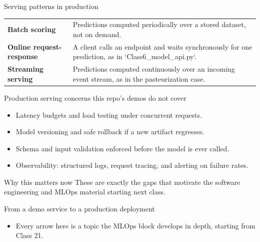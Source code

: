 \begin{frame}{Serving patterns in production}
\begin{tabularx}{\textwidth}{>{\bfseries}l X}
Batch scoring & Predictions computed periodically over a stored dataset, not on demand. \\
Online request-response & A client calls an endpoint and waits synchronously for one prediction, as in `Class6\_model\_api.py`. \\
Streaming serving & Predictions computed continuously over an incoming event stream, as in the pasteurization case. \\
\end{tabularx}
\coursefooter
\end{frame}

\begin{frame}{Production serving concerns this repo's demos do not cover}
\begin{itemize}
\item Latency budgets and load testing under concurrent requests.
\item Model versioning and safe rollback if a new artifact regresses.
\item Schema and input validation enforced before the model is ever called.
\item Observability: structured logs, request tracing, and alerting on failure rates.
\end{itemize}
\begin{block}{Why this matters now}
These are exactly the gaps that motivate the software engineering and MLOps material starting next class.
\end{block}
\coursefooter
\end{frame}

\begin{frame}{From a demo service to a production deployment}
\centering
{}
\vspace{0.4em}
\begin{itemize}
\item Every arrow here is a topic the MLOps block develops in depth, starting from Class 21.
\end{itemize}
\coursefooter
\end{frame}

